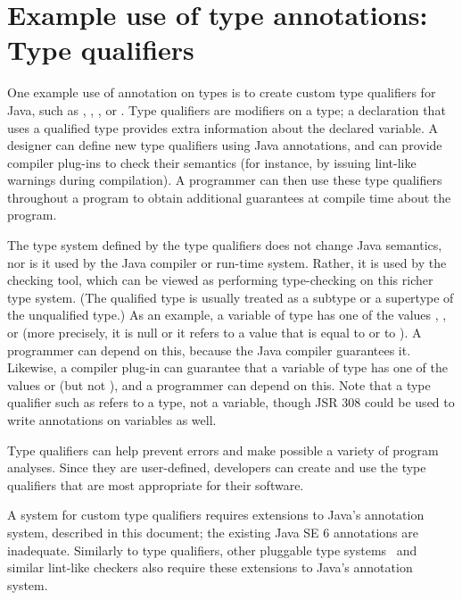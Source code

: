 \documentclass[10pt]{article}
\begin{document}

\label{page:non-normative-start}

\newpage
\appendix

\section{Example use of type annotations:  Type qualifiers\label{type-qualifiers}}

One example use of annotation on types is to create custom type qualifiers
for Java,
such as , , , or .
Type qualifiers are modifiers on a type; a declaration that uses a
qualified type provides extra
information about the declared variable.
A designer can define new type
qualifiers using Java annotations, and can provide compiler plug-ins to check
their semantics (for instance, by issuing lint-like warnings during
compilation).
A programmer can then use these type qualifiers
throughout a program to obtain additional guarantees at compile time
about the program.

The type system defined by the type qualifiers does not change Java
semantics, nor is it used by the Java compiler or run-time system.  Rather,
it is used by the checking tool, which can be viewed as performing
type-checking on this richer type system.  (The qualified type is usually
treated as a subtype or a supertype of the unqualified type.)
As an example, a variable of type  has one of the values
, , or  (more precisely, it is null or it
refers to a value that is equal to  or to \@).  A
programmer can depend on this, because the Java compiler guarantees it.
Likewise, a compiler plug-in can guarantee that a variable of type
 has one of the values  or 
(but not ), and a programmer can depend on this.  Note that a
type qualifier such as  refers to a type, not a variable,
though JSR 308 could be used to write annotations on variables as well.

Type qualifiers can help prevent errors and make possible a variety of
program analyses.  Since they are user-defined, developers can create
and use the type qualifiers that are most appropriate for their
software.

A system for custom type qualifiers requires
extensions to Java's annotation system, described in this document; the
existing Java SE 6 annotations are inadequate.
Similarly to type qualifiers, other pluggable type
systems~\cite{Bracha2004} and similar lint-like checkers also require these
extensions to Java's annotation system.
\end{document}
